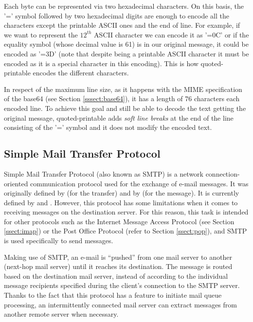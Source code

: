 Each byte can be represented via two hexadecimal characters. On this basis, the '=' symbol followed by two hexadecimal digits are enough to encode all the characters except the printable ASCII ones and the end of line. For example, if we want to represent the $12^{th}$ ASCII character we can encode it as '=0C' or if the equality symbol (whose decimal value is 61) is in our original message, it could be encoded as '=3D' (note that despite being a printable ASCII character it must be encoded as it is a special character in this encoding). This is how quoted-printable encodes the different characters.

In respect of the maximum line size, as it happens with the MIME specification of the base64 (see Section \ref{sssect:base64}), it has a length of 76 characters each encoded line. To achieve this goal and still be able to decode the text getting the original message, quoted-printable adds \textit{soft line breaks} at the end of the line consisting of the '=' symbol and it does not modify the encoded text.

\subsection{Simple Mail Transfer Protocol} \label{ssect:smtp}

Simple Mail Transfer Protocol (also known as SMTP) is a network connection-oriented communication protocol used for the exchange of e-mail messages. It was originally defined by \cite{rfc821} (for the transfer) and by \cite{rfc822} (for the message). It is currently defined by \cite{rfc5321} and \cite{rfc5322}. However, this protocol has some limitations when it comes to receiving messages on the destination server. For this reason, this task is intended for other protocols such as the Internet Message Access Protocol (see Section \ref{ssect:imap}) or the Post Office Protocol (refer to Section \ref{ssect:pop}), and SMTP is used specifically to send messages.

Making use of SMTP, an e-mail is ``pushed'' from one mail server to another (next-hop mail server) until it reaches its destination. The message is routed based on the destination mail server, instead of according to the individual message recipients specified during the client's connection to the SMTP server. Thanks to the fact that this protocol has a feature to initiate mail queue processing, an intermittently connected mail server can extract messages from another remote server when necessary.

